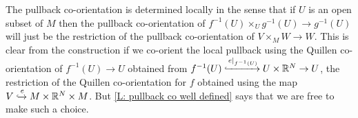 \begin{comment}
	Now, using $F_0$, $\td H$, and $F_1$ respectively in place of $e$ in \cref{D: pullback coorient}, we obtain three co-orientations of the pullbacks $(V \times I) \times_M W \to W$ with the map $V\times I \to M$ being given by $(x,t) \mapsto f(x)$ in all three cases.
	Note that such a map is certainly transverse to $g \colon W \to M$ if $f$ is.
	For specificity, let us focus on the homotopy $F_0$. As we know that the restrictions of $F_0$ to $V \times 0$ and $V \times 1$ are co-orientable, so is $F_0$ by \cref{L: co-orientable homotopies}. If we choose any co-orientation for $F_0$, then by

	We will see below in \cref{leibniz}, whose proof is independent of this one, that when accounting for co-orientations, pullback co-orientations satisfy a Leibniz rule of the following form, again allowing spaces to stand also for their maps:
	$$\bd (V \times_M W) = (\bd V) \times_M W \bigsqcup (-1)^{m-v} V \times_M (\bd W).$$
	Applying this in our current setting, each of our three homotopies will include boundary components of the form $\left(\bd (V\times I) \right)\times_M W$, which by and, in particular, two of the signed boundary components of each co-oriented $(V \times I) \times_M W \to W$ will be $(V \times \{0\}) \times_M W \to W$ and $(V \times \{1\}) \times_M W \to W$, occurring with opposite signs.
	In other words, with appropriate choices on the co-orientations of the homotopies, by \cref{D: co-oriented homotopy}, we obtain three sequential co-oriented (constant) homotopies from $f$ to itself.
	It now follows by applying \cref{R: stationary homotopy} sequentially that all four copies of $f$ must have the same co-orientation.
	In particular, this is the case for the co-orientations of $f$ obtained from the embeddings $e_0$ and $e_1$.
\end{comment}

\begin{remark}\label{R: local pullback co-orientations}
	The pullback co-orientation is determined locally in the sense that if $U$ is an open subset of $M$ then the pullback co-orientation of $f^{-1}(U) \times_U g^{-1}(U) \to g^{-1}(U)$ will just be the restriction of the pullback co-orientation of $V \times_M W \to W$.
	This is clear from the construction if we co-orient the local pullback using the Quillen co-orientation of $f^{-1}(U) \to U$ obtained from $f^{-1}(U) \xhookrightarrow{e|_{f^{-1}(U)}} U \times \mathbb{R}^N \to U$, the restriction of the Quillen co-orientation for $f$ obtained using the map $V\xhookrightarrow{e}M \times \mathbb{R}^N \times M$.
	But \cref{L: pullback co well defined} says that we are free to make such a choice.
\end{remark}

